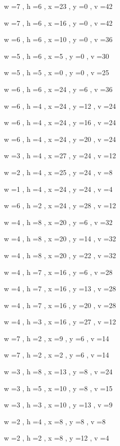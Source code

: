 \documentclass[11pt]{article}
\begin{document}


w =7 , h =6 , x =23 , y =0 , v =42
\par
w =7 , h =6 , x =16 , y =0 , v =42
\par
w =6 , h =6 , x =10 , y =0 , v =36
\par
w =5 , h =6 , x =5 , y =0 , v =30
\par
w =5 , h =5 , x =0 , y =0 , v =25
\par
w =6 , h =6 , x =24 , y =6 , v =36
\par
w =6 , h =4 , x =24 , y =12 , v =24
\par
w =6 , h =4 , x =24 , y =16 , v =24
\par
w =6 , h =4 , x =24 , y =20 , v =24
\par
w =3 , h =4 , x =27 , y =24 , v =12
\par
w =2 , h =4 , x =25 , y =24 , v =8
\par
w =1 , h =4 , x =24 , y =24 , v =4
\par
w =6 , h =2 , x =24 , y =28 , v =12
\par
w =4 , h =8 , x =20 , y =6 , v =32
\par
w =4 , h =8 , x =20 , y =14 , v =32
\par
w =4 , h =8 , x =20 , y =22 , v =32
\par
w =4 , h =7 , x =16 , y =6 , v =28
\par
w =4 , h =7 , x =16 , y =13 , v =28
\par
w =4 , h =7 , x =16 , y =20 , v =28
\par
w =4 , h =3 , x =16 , y =27 , v =12
\par
w =7 , h =2 , x =9 , y =6 , v =14
\par
w =7 , h =2 , x =2 , y =6 , v =14
\par
w =3 , h =8 , x =13 , y =8 , v =24
\par
w =3 , h =5 , x =10 , y =8 , v =15
\par
w =3 , h =3 , x =10 , y =13 , v =9
\par
w =2 , h =4 , x =8 , y =8 , v =8
\par
w =2 , h =2 , x =8 , y =12 , v =4
\par
\newpage
\end{document}

